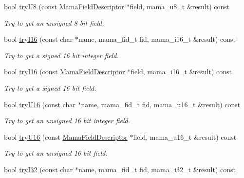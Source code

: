 \begin{DoxyCompactItemize}
bool \hyperlink{classWombat_1_1MamaMsg_abbb5f42e61b935638217344a2fc5a7cb}{tryU8} (const \hyperlink{classWombat_1_1MamaFieldDescriptor}{MamaFieldDescriptor} $\ast$field, mama\_\-u8\_\-t \&result) const 
\begin{DoxyCompactList}\small\item\em Try to get an unsigned 8 bit field. \item\end{DoxyCompactList}\item 
bool \hyperlink{classWombat_1_1MamaMsg_afc5970314030d3deef6d8936478a0dd0}{tryI16} (const char $\ast$name, mama\_\-fid\_\-t fid, mama\_\-i16\_\-t \&result) const 
\begin{DoxyCompactList}\small\item\em Try to get a signed 16 bit integer field. \item\end{DoxyCompactList}\item 
bool \hyperlink{classWombat_1_1MamaMsg_ae1eb886004eef6d6b142829ff60bcc16}{tryI16} (const \hyperlink{classWombat_1_1MamaFieldDescriptor}{MamaFieldDescriptor} $\ast$field, mama\_\-i16\_\-t \&result) const 
\begin{DoxyCompactList}\small\item\em Try to get a signed 16 bit field. \item\end{DoxyCompactList}\item 
bool \hyperlink{classWombat_1_1MamaMsg_a2eec8465af21f764f6136bc507c1c4d1}{tryU16} (const char $\ast$name, mama\_\-fid\_\-t fid, mama\_\-u16\_\-t \&result) const 
\begin{DoxyCompactList}\small\item\em Try to get an unsigned 16 bit integer field. \item\end{DoxyCompactList}\item 
bool \hyperlink{classWombat_1_1MamaMsg_a950562e88ee2ab3af474868e7127a44c}{tryU16} (const \hyperlink{classWombat_1_1MamaFieldDescriptor}{MamaFieldDescriptor} $\ast$field, mama\_\-u16\_\-t \&result) const 
\begin{DoxyCompactList}\small\item\em Try to get an unsigned 16 bit field. \item\end{DoxyCompactList}\item 
bool \hyperlink{classWombat_1_1MamaMsg_adc7f892793ac819719110984b0a509b5}{tryI32} (const char $\ast$name, mama\_\-fid\_\-t fid, mama\_\-i32\_\-t \&result) const 

\end{DoxyCompactItemize}
